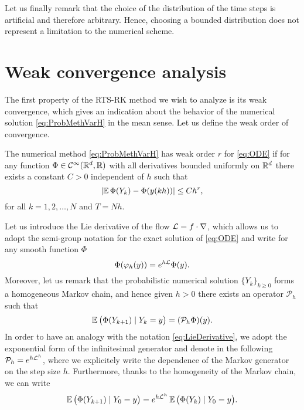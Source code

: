 \documentclass[10pt]{article}
\begin{document}
Let us finally remark that the choice of the distribution of the time steps is artificial and therefore arbitrary. Hence, choosing a bounded distribution does not represent a limitation to the numerical scheme.

\section{Weak convergence analysis}\label{sec:WeakOrder}

The first property of the RTS-RK method we wish to analyze is its weak convergence, which gives an indication about the behavior of the numerical solution \eqref{eq:ProbMethVarH} in the mean sense. Let us define the weak order of convergence. 
\begin{definition} The numerical method \eqref{eq:ProbMethVarH} has weak order $r$ for \eqref{eq:ODE} if for any function $\Phi\in \mathcal C^\infty(\mathbb{R}^d, \mathbb{R})$ with all derivatives bounded uniformly on $\mathbb{R}^d$ there exists a constant $C > 0$ independent of $h$ such that
	\begin{equation}
		\lvert\operatorname{\mathbb{E}}\Phi(Y_k) - \Phi(y(kh))\rvert \leq Ch^r,
	\end{equation}
	for all $k = 1, 2, \ldots, N$ and $T = Nh$.
\end{definition} 
Let us introduce the Lie derivative of the flow $\mathcal{L} = f \cdot \nabla$, which allows us to adopt the semi-group notation for the exact solution of \eqref{eq:ODE} and write for any smooth function $\Phi$
\begin{equation}\label{eq:LieDerivative}
	\Phi(\varphi_h(y)) = e^{h\mathcal{L}} \Phi(y).
\end{equation}
Moreover, let us remark that the probabilistic numerical solution $\{Y_k\}_{k\geq 0}$ forms a homogeneous Markov chain, and hence given $h > 0$ there exists an operator $\mathcal{P}_h$ such that
\begin{equation}
	\operatorname{\mathbb{E}} \big(\Phi(Y_{k+1})\mid Y_k = y\big) = (\mathcal{P}_h\Phi)(y).
\end{equation}
In order to have an analogy with the notation \eqref{eq:LieDerivative}, we adopt the exponential form of the infinitesimal generator and denote in the following $\mathcal{P}_h = e^{h\mathcal{L}^h}$, where we explicitely write the dependence of the Markov generator on the step size $h$. Furthermore, thanks to the homogeneity of the Markov chain, we can write
\begin{equation}\label{eq:MarkovProperty}
	\operatorname{\mathbb{E}} \big(\Phi(Y_{k+1})\mid Y_0 = y\big) = e^{h\mathcal{L}^h}\operatorname{\mathbb{E}} \big(\Phi(Y_k)\mid Y_0 = y\big).
\end{equation}
\end{document}
